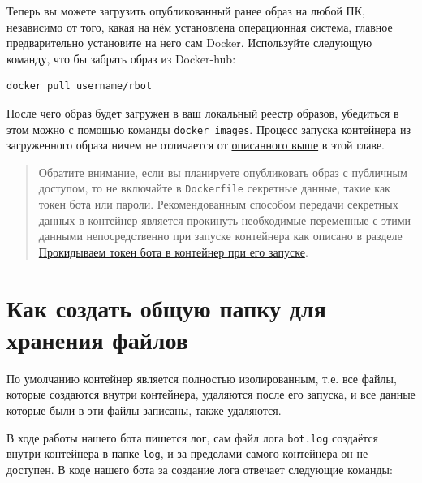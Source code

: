 \documentclass[
]{book}
\begin{document}
Теперь вы можете загрузить опубликованный ранее образ на любой ПК, независимо от того, какая на нём установлена операционная система, главное предварительно установите на него сам Docker. Используйте следующую команду, что бы забрать образ из Docker-hub:

\begin{verbatim}
docker pull username/rbot
\end{verbatim}

После чего образ будет загружен в ваш локальный реестр образов, убедиться в этом можно с помощью команды \texttt{docker\ images}. Процесс запуска контейнера из загруженного образа ничем не отличается от \hyperref[ux437ux430ux43fux443ux441ux43a-ux43aux43eux43dux442ux435ux439ux43dux435ux440ux430]{описанного выше} в этой главе.

\begin{quote}
Обратите внимание, если вы планируете опубликовать образ с публичным доступом, то не включайте в \texttt{Dockerfile} секретные данные, такие как токен бота или пароли. Рекомендованным способом передачи секретных данных в контейнер является прокинуть необходимые переменные с этими данными непосредственно при запуске контейнера как описано в разделе \hyperref[ux43fux440ux43eux43aux438ux434ux44bux432ux430ux435ux43c-ux442ux43eux43aux435ux43d-ux431ux43eux442ux430-ux432-ux43aux43eux43dux442ux435ux439ux43dux435ux440-ux43fux440ux438-ux435ux433ux43e-ux437ux430ux43fux443ux441ux43aux435]{Прокидываем токен бота в контейнер при его запуске}.
\end{quote}

\section{Как создать общую папку для хранения файлов}\label{ux43aux430ux43a-ux441ux43eux437ux434ux430ux442ux44c-ux43eux431ux449ux443ux44e-ux43fux430ux43fux43aux443-ux434ux43bux44f-ux445ux440ux430ux43dux435ux43dux438ux44f-ux444ux430ux439ux43bux43eux432}

По умолчанию контейнер является полностью изолированным, т.е. все файлы, которые создаются внутри контейнера, удаляются после его запуска, и все данные которые были в эти файлы записаны, также удаляются.

В ходе работы нашего бота пишется лог, сам файл лога \texttt{bot.log} создаётся внутри контейнера в папке \texttt{log}, и за пределами самого контейнера он не доступен. В коде нашего бота за создание лога отвечает следующие команды:
\end{document}
